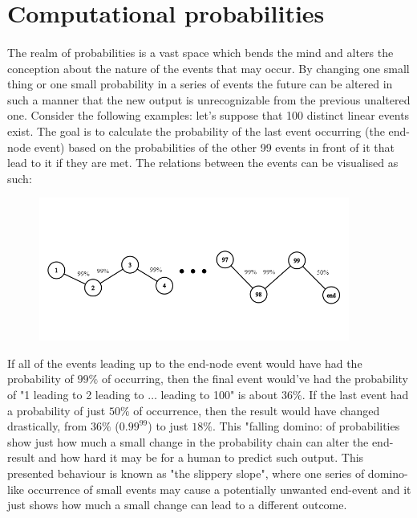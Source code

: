 \documentclass[letterpaper]{article}
\begin{document}
\newpage

\section{Computational probabilities}

\paragraph{}

The realm of probabilities is a vast space which bends the mind and alters the conception about the nature of the events that may occur. By changing one small thing or one small probability in a series of events the future can be altered in such a manner that the new output is unrecognizable from the previous unaltered one. Consider the following examples: let's suppose that 100 distinct linear events exist. The goal is to calculate the probability of the last event occurring (the end-node event) based on the probabilities of the other 99 events in front of it that lead to it if they are met. The relations between the events can be visualised as such: 

\begin{figure} [h!]
\centering
\includegraphics[width=0.91\textwidth]{pngOfDiagrams/slipperyslope.png}
\end{figure}

If all of the events leading up to the end-node event would have had the probability of $99\%$ of occurring, then the final event would've had the probability of "1 leading to 2 leading to $\dots$ leading to 100" is about $36\%$. If the last event had a probability of just $50\%$ of occurrence, then the result would have changed drastically, from $36\%$ ($0.99 ^ {99}$) to just $18\%$. This "falling domino: of probabilities show just how much a small change in the probability chain can alter the end-result and how hard it may be for a human to predict such output. This presented behaviour is known as "the slippery slope", where one series of domino-like occurrence of small events may cause a potentially unwanted end-event and it just shows how much a small change can lead to a different outcome.  
\end{document}

